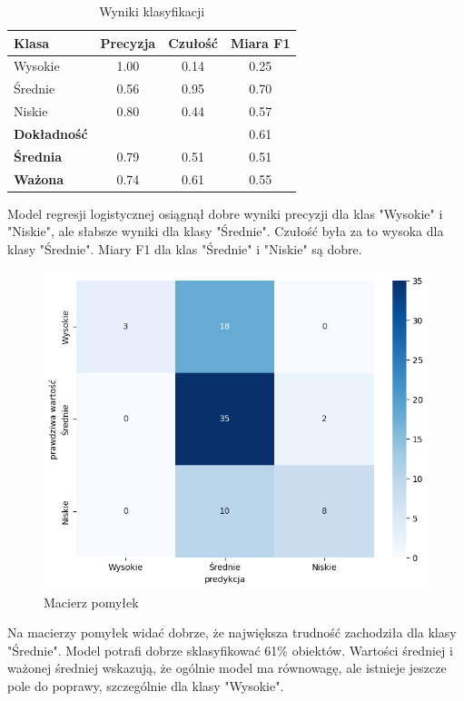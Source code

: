 \documentclass[11pt]{article}
\begin{document}
    \begin{table}[hbt]
    \centering
    \begin{tabular}{lccc}
    \hline
    \textbf{Klasa} & \textbf{Precyzja} & \textbf{Czułość} & \textbf{Miara F1} \\
    \hline
    Wysokie   & 1.00 & 0.14 & 0.25 \\
    Średnie & 0.56 & 0.95 & 0.70 \\
    Niskie  & 0.80 & 0.44 & 0.57 \\
    \hline
    \textbf{Dokładność} &  &  & 0.61 \\
    \textbf{Średnia} & 0.79 & 0.51 & 0.51 \\
    \textbf{Ważona}  & 0.74 & 0.61 & 0.55 \\
    \hline
    \end{tabular}
    \caption{Wyniki klasyfikacji}
    \end{table}

    Model regresji logistycznej osiągnął dobre wyniki precyzji dla klas "Wysokie" i "Niskie", ale słabsze wyniki dla klasy "Średnie". Czułość była za to wysoka dla klasy "Średnie". Miary F1 dla klas "Średnie" i "Niskie" są dobre.
    \newline

     \begin{figure}[hbt]
    \includegraphics[scale=0.40]{confusions.png}
    \caption{Macierz pomyłek}
    \end{figure}
    Na macierzy pomyłek widać dobrze, że największa trudność zachodziła dla klasy "Średnie". \newline
    Model potrafi dobrze sklasyfikować 61\% obiektów. Wartości średniej i ważonej średniej wskazują, że ogólnie model ma równowagę, ale istnieje jeszcze pole do poprawy, szczególnie dla klasy "Wysokie".
    
\end{document}
